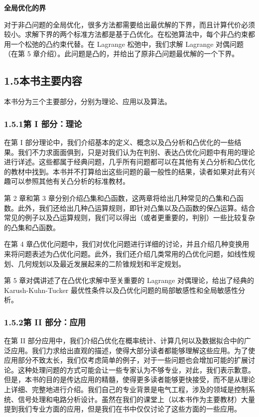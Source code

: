 \documentclass[UTF8, 12pt, fontset=fandol, oneside]{ctexart}
\begin{document}
\noindent\textbf{全局优化的界}

对于非凸问题的全局优化，很多方法都需要给出最优解的下界，而且计算代价必须较小。求解下界的两个标准方法都是基于凸优化。在松弛算法中，每个非凸约束都用一个松弛的凸约束代替。在 Lagrange 松弛中，我们求解 Lagrange 对偶问题（在第 5 章介绍）。此问题是凸的，并给出了原非凸问题最优解的一个下界。

\subsection*{1.5\quad 本书主要内容}

本书分为三个主要部分，分别为理论、应用以及算法。

\subsubsection*{1.5.1\quad 第 I 部分：理论}

在第 I 部分理论中，我们介绍基本的定义、概念以及凸分析和凸优化的一些结果。我们不力求面面俱到，只是对我们认为在判别、表达凸优化问题中有用的理论进行详述。这些都属于经典问题，几乎所有问题都可以在其他有关凸分析和凸优化的教材中找到。本书并不打算给出这些问题的最一般性的结果，读者如果对此有兴趣可以参照其他有关凸分析的标准教材。

第 2 章和第 3 章分别介绍凸集和凸函数，这两章将给出几种常见的凸集和凸函数。此外，我们还给出几种凸运算规则，即针对凸集以及凸函数的保凸运算。结合常见的例子以及凸运算规则，我们可以得出（或者更重要的，判别）一些比较复杂的凸集和凸函数。

在第 4 章凸优化问题中，我们对优化问题进行详细的讨论，并且介绍几种变换用来将问题表述为凸优化问题。此外，我们还介绍几类常用的凸优化问题，如线性规划、几何规划以及最近发展起来的二阶锥规划和半定规划。

第 5 章对偶讲述了在凸优化求解中至关重要的 Lagrange 对偶理论，给出了经典的 Karush-Kuhn-Tucker 最优性条件以及凸优化问题的局部敏感性和全局敏感性分析。

\subsubsection*{1.5.2\quad 第 II 部分：应用}

在第 II 部分应用中，我们介绍凸优化在概率统计、计算几何以及数据拟合中的广泛应用。我们力求给出直观的描述，使得大部分读者都能够理解这些应用。为了使应用部分不致太长，我们仅考虑简单的例子，对于一些问题也会增加可能的扩展讨论。这种处理问题的方式可能会让一些专家认为不够专业，对此，我们表示歉意。但是，本书的目的是传达应用的精髓，使得更多读者能够更快接受，而不是从理论上详细、完整地进行介绍。我们自己的专业背景是电气工程，涉及的领域是控制系统、信号处理和电路分析设计。虽然在我们的课堂上（以本书作为主要教材）大量提到我们专业方面的应用，但是我们在书中仅仅讨论了这些方面的一些应用。
\end{document}
